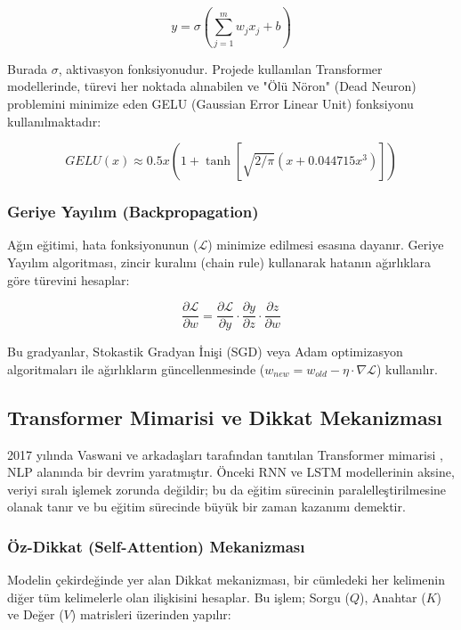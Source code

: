 \documentclass[12pt,a4paper]{report}
\begin{document}
\begin{equation}
    y = \sigma \left( \sum_{j=1}^{m} w_j x_j + b \right)
\end{equation}

Burada $\sigma$, aktivasyon fonksiyonudur. Projede kullanılan Transformer modellerinde, türevi her noktada alınabilen ve "Ölü Nöron" (Dead Neuron) problemini minimize eden GELU (Gaussian Error Linear Unit) fonksiyonu kullanılmaktadır:

\begin{equation}
    GELU(x) \approx 0.5x(1 + \tanh[\sqrt{2/\pi}(x + 0.044715x^3)])
\end{equation}

\subsubsection{Geriye Yayılım (Backpropagation)}
Ağın eğitimi, hata fonksiyonunun ($\mathcal{L}$) minimize edilmesi esasına dayanır. Geriye Yayılım algoritması, zincir kuralını (chain rule) kullanarak hatanın ağırlıklara göre türevini hesaplar:

\begin{equation}
    \frac{\partial \mathcal{L}}{\partial w} = \frac{\partial \mathcal{L}}{\partial y} \cdot \frac{\partial y}{\partial z} \cdot \frac{\partial z}{\partial w}
\end{equation}

Bu gradyanlar, Stokastik Gradyan İnişi (SGD) veya Adam optimizasyon algoritmaları ile ağırlıkların güncellenmesinde ($w_{new} = w_{old} - \eta \cdot \nabla \mathcal{L}$) kullanılır.

\subsection{Transformer Mimarisi ve Dikkat Mekanizması}
2017 yılında Vaswani ve arkadaşları tarafından tanıtılan Transformer mimarisi \cite{vaswani2017attention}, NLP alanında bir devrim yaratmıştır. Önceki RNN ve LSTM modellerinin aksine, veriyi sıralı işlemek zorunda değildir; bu da eğitim sürecinin paralelleştirilmesine olanak tanır ve bu eğitim sürecinde büyük bir zaman kazanımı demektir.


\subsubsection{Öz-Dikkat (Self-Attention) Mekanizması}
Modelin çekirdeğinde yer alan Dikkat mekanizması, bir cümledeki her kelimenin diğer tüm kelimelerle olan ilişkisini hesaplar. Bu işlem; Sorgu ($Q$), Anahtar ($K$) ve Değer ($V$) matrisleri üzerinden yapılır:
\end{document}
